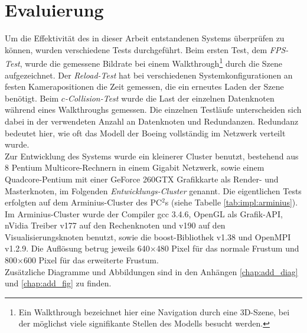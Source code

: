 \chapter{Evaluierung}
\label{chap:eval}
%
%
%

Um die Effektivität des in dieser Arbeit entstandenen Systems überprüfen zu können, wurden verschiedene Tests durchgeführt.
Beim ersten Test, dem \textit{FPS-Test}, wurde die gemessene Bildrate bei einem Walkthrough\footnote{Ein Walkthrough bezeichnet hier eine Navigation durch eine 3D-Szene, bei der möglichst viele signifikante Stellen des Modells besucht werden.} durch die Szene aufgezeichnet. Der \textit{Reload-Test} hat bei verschiedenen Systemkonfigurationen an festen Kamerapositionen die Zeit gemessen, die ein erneutes Laden der Szene benötigt. Beim \textit{$c$-Collision-Test} wurde die Last der einzelnen Datenknoten während eines Walkthroughs gemessen. Die einzelnen Testläufe unterscheiden sich dabei in der verwendeten Anzahl an Datenknoten und Redundanzen. Redundanz bedeutet hier, wie oft das Modell der Boeing vollständig im Netzwerk verteilt wurde. \\
Zur Entwicklung des Systems wurde ein kleinerer Cluster benutzt, bestehend aus 8 Pentium Multicore-Rechnern in einem Gigabit Netzwerk, sowie einem Quadcore-Pentium mit einer GeForce 260GTX Grafikkarte als Render- und Masterknoten, im Folgenden \textit{Entwicklungs-Cluster} genannt. Die eigentlichen Tests erfolgten auf dem Arminius-Cluster des PC$^2$s (siehe Tabelle \ref{tab:impl:arminius}).\\
Im Arminius-Cluster wurde der Compiler gcc 3.4.6, OpenGL als Grafik-API, nVidia Treiber v177 auf den Rechenknoten und v190 auf den Visualisierungsknoten benutzt, sowie die boost-Bibliothek v1.38 und OpenMPI v1.2.9. Die Auflösung betrug jeweils 640$\times$480 Pixel für das normale Frustum und 800$\times$600 Pixel für das erweiterte Frustum.\\
Zusätzliche Diagramme und Abbildungen sind in den Anhängen \ref{chap:add_diag} und \ref{chap:add_fig} zu finden.

